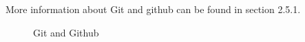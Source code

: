 More information about Git and github can be found in section 2.5.1.

\begin{figure}[H]
	\centering
	\caption{Git and Github}
\end{figure}
